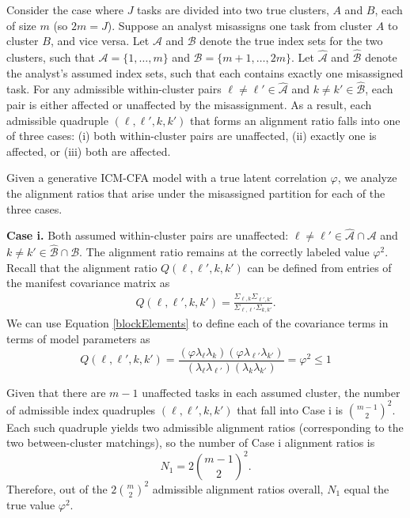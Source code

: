 \documentclass[
  american,
  man,floatsintext]{apa7}
\begin{document}
Consider the case where \(J\) tasks are divided into two true clusters, \(A\) and \(B\), each of size \(m\) (so \(2m=J\)). Suppose an analyst misassigns one task from cluster \(A\) to cluster \(B\), and vice versa. Let \(\mathcal{A}\) and \(\mathcal{B}\) denote the true index sets for the two clusters, such that \(\mathcal{A}=\{1,\ldots,m\}\) and \(\mathcal{B}=\{m+1,\ldots,2m\}\). Let \(\widehat{\mathcal A}\) and \(\widehat{\mathcal B}\) denote the analyst's assumed index sets, such that each contains exactly one misassigned task. For any admissible within-cluster pairs \(\ell\neq \ell'\in\widehat{\mathcal A}\) and \(k\neq k'\in\widehat{\mathcal B}\), each pair is either affected or unaffected by the misassignment. As a result, each admissible quadruple \((\ell,\ell',k,k')\) that forms an alignment ratio falls into one of three cases: (i) both within-cluster pairs are unaffected, (ii) exactly one is affected, or (iii) both are affected.

Given a generative ICM-CFA model with a true latent correlation \(\varphi\), we analyze the alignment ratios that arise under the misassigned partition for each of the three cases.

\textbf{Case i.} Both assumed within-cluster pairs are unaffected: \(\ell\neq \ell'\in \widehat{\mathcal A}\cap \mathcal A\) and \(k\neq k'\in \widehat{\mathcal B}\cap \mathcal B\). The alignment ratio remains at the correctly labeled value \(\varphi^2\). Recall that the alignment ratio \(Q(\ell,\ell',k,k')\) can be defined from entries of the manifest covariance matrix as
\[
\begin{aligned}
Q(\ell,\ell',k,k') = \frac{\Sigma_{\ell,k} \Sigma_{\ell',k'}}{\Sigma_{\ell,\ell'} \Sigma_{k,k'}}.
\end{aligned}
\]
We can use Equation \eqref{blockElements} to define each of the covariance terms in terms of model parameters as
\[
Q(\ell,\ell',k,k') = \frac{(\varphi \lambda_\ell \lambda_k)(\varphi \lambda_{\ell'} \lambda_{k'})}{(\lambda_\ell \lambda_{\ell'})(\lambda_k \lambda_{k'})} = \varphi^2 \le 1
\]

Given that there are \(m-1\) unaffected tasks in each assumed cluster, the number of admissible index quadruples \((\ell,\ell',k,k')\) that fall into Case i is \(\binom{m-1}{2}^2\). Each such quadruple yields two admissible alignment ratios (corresponding to the two between-cluster matchings), so the number of Case i alignment ratios is
\[
N_1=2\binom{m-1}{2}^2.
\]
Therefore, out of the \(2\binom{m}{2}^2\) admissible alignment ratios overall, \(N_1\) equal the true value \(\varphi^2\).
\end{document}
